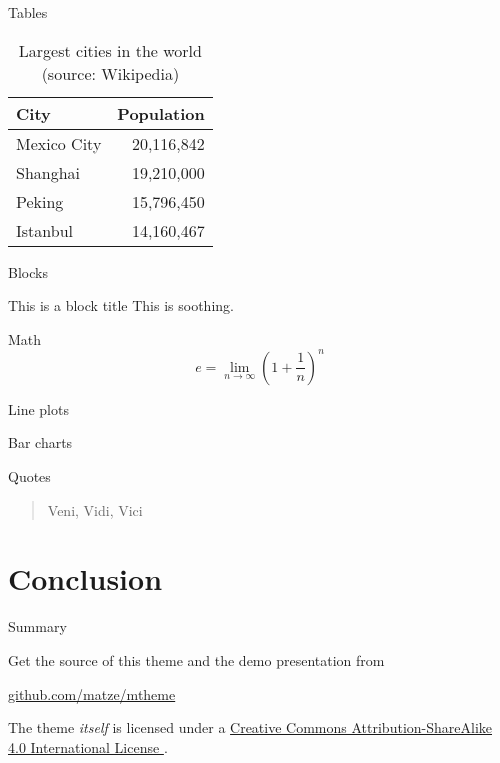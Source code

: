 \documentclass[10pt, compress]{beamer}
\newcommand{\ehref}[2]{\href{#1}{#2 \hspace{-.2em}{\scriptsize\faExternalLink}}}
\begin{document}
\begin{frame}{Tables}
  \begin{table}
    \caption{Largest cities in the world (source: Wikipedia)}
    \begin{tabular}{lr}
      \toprule
      City & Population\\
      \midrule
      Mexico City & 20,116,842\\
      Shanghai & 19,210,000\\
      Peking & 15,796,450\\
      Istanbul & 14,160,467\\
      \bottomrule
    \end{tabular}
  \end{table}
\end{frame}
\begin{frame}{Blocks}

  \begin{block}{This is a block title}
    This is soothing.
  \end{block}

\end{frame}
\begin{frame}{Math}
  \begin{equation*}
    e = \lim_{n\to \infty} \left(1 + \frac{1}{n}\right)^n
  \end{equation*}
\end{frame}
\begin{frame}{Line plots}
  \begin{figure}
    
  \end{figure}
\end{frame}
\begin{frame}{Bar charts}
  \begin{figure}
    
  \end{figure}
\end{frame}
\begin{frame}{Quotes}
  \begin{quote}
    Veni, Vidi, Vici
  \end{quote}
\end{frame}


\section{Conclusion}

\begin{frame}{Summary}

  Get the source of this theme and the demo presentation from

  \begin{center}\url{github.com/matze/mtheme}\end{center}

  The theme \emph{itself} is licensed under a
  \ehref{http://creativecommons.org/licenses/by-sa/4.0/}{Creative Commons
  Attribution-ShareAlike 4.0 International License}.

\end{frame}

\end{document}
